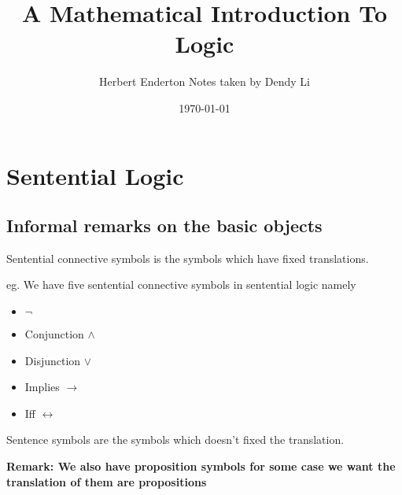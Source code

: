 \documentclass[11pt]{article}
\author{Herbert Enderton Notes taken by Dendy Li}
\date{\today}
\title{A Mathematical Introduction To Logic}
\begin{document}
\maketitle
\tableofcontents

\section{Sentential Logic}
\label{sec:orgf8a340f}
\subsection{Informal remarks on the basic objects}
\label{sec:orga1cb7e1}

\begin{center}\end{center}


\begin{definition}
Sentential connective symbols is the symbols which have fixed translations.
\end{definition}

eg. We have five sentential connective symbols in sentential logic namely
\begin{itemize}
\item \(\neg\)
\item Conjunction \(\land\)
\item Disjunction \(\lor\)
\item Implies \(\rightarrow\)
\item Iff \(\leftrightarrow\)
\end{itemize}

\begin{definition}
Sentence symbols are the symbols which doesn't fixed the translation.
\end{definition}

\textbf{Remark: We also have proposition symbols for some case we want the translation of them are propositions}
\end{document}
